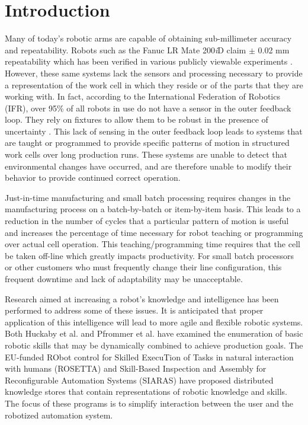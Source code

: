 \section{Introduction}
Many of today's robotic arms are capable of obtaining
sub-millimeter accuracy and repeatability. Robots such as the
Fanuc LR Mate 200\textit{i}D claim $\pm$ 0.02 mm repeatability
\cite{Fanuc200iD} which has been verified in various publicly
viewable experiments \cite{RobotAccuracy} \cite{RobotAccuracy2}.
However, these
same systems lack
the sensors and processing necessary to provide a representation of
the work cell in which they reside or of the parts that they are working
with. In fact, according to the International Federation of Robotics (IFR),
over 95\% of all robots in use do not have a sensor in the outer feedback loop.
They rely on fixtures to allow them to be robust in the presence of 
uncertainty \cite{WorldRobot}. This lack of sensing in the outer feedback loop leads to
systems that are taught or programmed to provide specific patterns of motion in
structured work cells over long production runs. These systems are unable
to detect that environmental changes have occurred, and are therefore unable
to modify their behavior to provide continued correct operation. 

Just-in-time manufacturing and small
batch processing requires changes in the manufacturing process on a batch-by-batch
or item-by-item basis. This leads to a reduction in the number of cycles
that a particular pattern of motion is useful and increases the 
percentage of time necessary for robot teaching or programming over actual cell operation.
This teaching/programming time requires that the 
cell be taken off-line which greatly impacts productivity.
For small batch processors or other customers who must frequently change their line configuration, 
this frequent downtime and lack of adaptability may be unacceptable.

Research aimed at increasing a robot's knowledge and intelligence has been performed 
to address some of these issues. 
It is anticipated that proper application of this intelligence
will lead to more agile and flexible robotic systems. Both Huckaby et al.
\cite{Huckaby2012} and Pfrommer et al. \cite{Pfrommer2013} have examined the enumeration
of basic robotic skills that may be dynamically combined to achieve production goals.
The EU-funded RObot control for Skilled ExecuTion of Tasks in natural interaction with
humans (ROSETTA) \cite{Patel2012} and Skill-Based Inspection and Assembly for 
Reconfigurable Automation Systems (SIARAS) \cite{Stenmark2013} have proposed 
distributed knowledge
stores that contain representations of robotic knowledge and skills. The focus of these
programs is to simplify interaction between the user and the robotized automation system.

